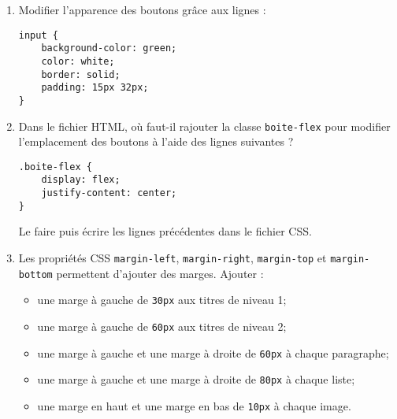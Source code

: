 \documentclass[a4paper,dvipsnames]{article}
\begin{document}
\begin{activite}[breakable]{}{}
\begin{enumerate}
      \item Modifier l'apparence des boutons grâce aux lignes :
	\begin{verbatim}
input {
    background-color: green;
    color: white;
    border: solid;
    padding: 15px 32px;
}
	\end{verbatim}
      \item Dans le fichier HTML, où faut-il rajouter la classe \texttt{boite-flex} pour modifier l'emplacement des boutons à l'aide des lignes suivantes ?
	\begin{verbatim}
.boite-flex {
    display: flex;
    justify-content: center;
}
	\end{verbatim}
	Le faire puis écrire les lignes précédentes dans le fichier CSS.
      \item Les propriétés CSS \texttt{margin-left}, \texttt{margin-right}, \texttt{margin-top} et \texttt{margin-bottom} permettent d'ajouter des marges. Ajouter :
	\begin{itemize}
	  \item une marge à gauche de \texttt{30px} aux titres de niveau 1;
	  \item une marge à gauche de \texttt{60px} aux titres de niveau 2;
	  \item une marge à gauche et une marge à droite de \texttt{60px} à chaque paragraphe;
	  \item une marge à gauche et une marge à droite de \texttt{80px} à chaque liste;
	  \item une marge en haut et une marge en bas de \texttt{10px} à chaque image.
	\end{itemize}
    \end{enumerate}
\end{activite}
\end{document}
